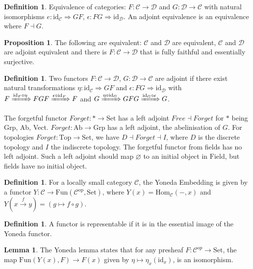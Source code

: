 \documentclass[a4paper,10pt]{article}
\theoremstyle{definition}
\newtheorem{definition}[theorem]{Definition}
\newtheorem{lemma}[theorem]{Lemma}
\newtheorem{proposition}[theorem]{Proposition}
\newcommand{\Hom}[3][C]{\mathrm{Hom}_\mathcal{#1}(#2, #3)}
\newcommand{\C}{\mathcal{C}}
\newcommand{\D}{\mathcal{D}}
\newcommand{\id}{\mathrm{id}}
\newcommand{\Set}{\mathrm{Set}}
\begin{document}
\begin{definition}
    Equivalence of categories: $F \colon \C \rightarrow \D$ and $G \colon \D \rightarrow \C$ with natural isomorphisms $e \colon \id_{\C} \Rightarrow GF$, $\epsilon \colon FG \Rightarrow \id_{\D}$. An adjoint equivalence is an equivalence where $F \dashv G$.
\end{definition}

\begin{proposition}
    The following are equivalent: $\C$ and $\D$ are equivalent, $\C$ and $\D$ are adjoint equivalent and there is $F \colon \C \rightarrow \D$ that is fully faithful and essentially surjective. 
\end{proposition}

\begin{definition}
    Two functors $F \colon \C \rightarrow \D$, $G \colon \D \rightarrow \C$ are adjoint if there exist natural transformations $\eta \colon \id_{\C} \Rightarrow GF$ and $\epsilon \colon FG \Rightarrow \id_{\D}$ with $F \xRightarrow{\id_F \circ \eta} FGF \xRightarrow{\epsilon \circ \id_F} F$ and $G \xRightarrow{\eta \circ \id_G} GFG \xRightarrow{\id_G \circ \epsilon} G$.
\end{definition}

The forgetful functor $\mathit{Forget} \colon * \rightarrow \Set$ has a left adjoint $\mathit{Free} \dashv \mathit{Forget}$ for $*$ being Grp, Ab, Vect. $\mathit{Forget} \colon \mathrm{Ab} \rightarrow \mathrm{Grp}$ has a left adjoint, the abelinisation of $G$. For topologies $\mathit{Forget} \colon \mathrm{Top} \longrightarrow \Set$, we have $D \dashv \mathit{Forget} \dashv I$, where $D$ is the discrete topology and $I$ the indiscrete topology.
The forgetful functor from fields has no left adjoint. Such a left adjoint should map $\varnothing$ to an initial object in $\mathrm{Field}$, but fields have no initial object.
\begin{definition}
    For a locally small category $\C$, the Yoneda Embedding is given by a functor $Y \colon \C \longrightarrow \mathrm{Fun}(\C^\mathrm{op}, \Set)$, where $Y(x) = \Hom{-}{x}$ and $Y(x \xrightarrow{f} y)= (g \mapsto f \circ g)$.
\end{definition}

\begin{definition}
    A functor is representable if it is in the essential image of the Yoneda functor. 
\end{definition}

\begin{lemma}
    The Yoneda lemma states that for any presheaf $F \colon \C^{op} \rightarrow \Set$, the map $\mathrm{Fun}(Y(x), F) \rightarrow F(x)$ given by $\eta \mapsto \eta_x(\id_x)$, is an isomorphism.
\end{lemma}
\end{document}
